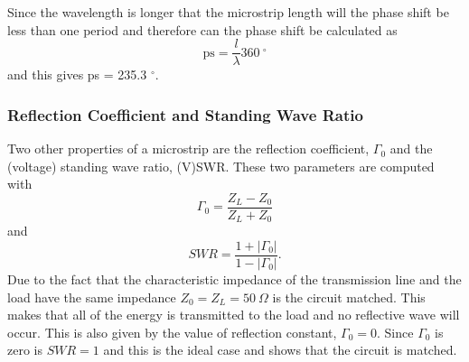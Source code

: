 \documentclass[report.tex]{subfiles}
\begin{document}
Since the wavelength is longer that the microstrip length will the phase shift be less than one period and therefore can the phase shift be calculated as
\begin{equation}
	\text{ps} = \dfrac{l}{\lambda} 360 \:^\circ
\end{equation}
and this gives ps = 235.3 $^\circ$.
\subsubsection{Reflection Coefficient and Standing Wave Ratio}
Two other properties of a microstrip are the reflection coefficient, $\Gamma_0$ and the (voltage) standing wave ratio, (V)SWR. These two parameters are computed with
\begin{equation}
	\Gamma_0 = \dfrac{Z_L - Z_0}{Z_L + Z_0}
\end{equation}
and
\begin{equation}
	SWR = \dfrac{1 + \left|\Gamma_0\right|}{1 - \left|\Gamma_0\right|}\text{.}
\end{equation}
Due to the fact that the characteristic impedance of the transmission line and the load have the same impedance $Z_0 = Z_L = 50\:\Omega$ is the circuit matched. This makes that all of the energy is transmitted to the load and no reflective wave will occur. This is also given by the value of reflection constant, $\Gamma_0 = 0\text{.}$ Since $\Gamma_0$ is zero is $SWR = 1$ and this is the ideal case and shows that the circuit is matched.
\end{document}
